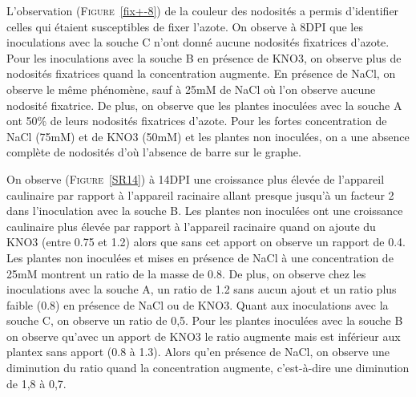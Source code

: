\documentclass[12pt,a4paper,onecolumn]{article}
\begin{document}
\begin{multicols}{2}
			L’observation (\textsc{Figure}~\ref{fix+-8}) de la couleur des nodosités a permis d'identifier celles qui étaient susceptibles de fixer l’azote.  On observe à 8DPI que les inoculations avec la souche C n’ont donné aucune nodosités fixatrices d’azote. Pour les inoculations avec la souche B en présence de KNO3, on observe plus de nodosités fixatrices quand la concentration augmente. En présence de NaCl, on observe le même phénomène, sauf à 25mM de NaCl où l'on observe aucune nodosité fixatrice. De plus, on observe que les plantes inoculées avec la souche A ont 50\% de leurs nodosités fixatrices d’azote. Pour les fortes concentration de NaCl (75mM) et de KNO3 (50mM) et les plantes non inoculées, on a une absence complète de nodosités d’où l’absence de barre sur le graphe.





			On observe (\textsc{Figure}~\ref{SR14}) à 14DPI une croissance plus élevée de l’appareil caulinaire par rapport à l’appareil racinaire allant presque jusqu'à un facteur 2 dans l’inoculation avec la souche B. Les plantes non inoculées ont une croissance caulinaire plus élevée par rapport à l’appareil racinaire quand on ajoute du KNO3 (entre 0.75 et 1.2) alors que sans cet apport on observe un rapport de 0.4. Les plantes non inoculées et mises en présence de NaCl à une concentration de 25mM montrent un ratio de la masse de 0.8. De plus, on observe chez les inoculations avec la souche A, un ratio de 1.2 sans aucun ajout et un ratio plus faible (0.8) en présence de NaCl ou de KNO3. Quant aux inoculations avec la souche C, on observe un ratio de 0,5. Pour les plantes inoculées avec la souche B on observe qu’avec un apport de KNO3 le ratio augmente mais est inférieur aux plantex sans apport (0.8 à 1.3). Alors qu’en présence de NaCl, on observe une diminution du ratio quand la concentration augmente, c'est-à-dire une diminution de 1,8 à 0,7.



\end{multicols}
\end{document}
